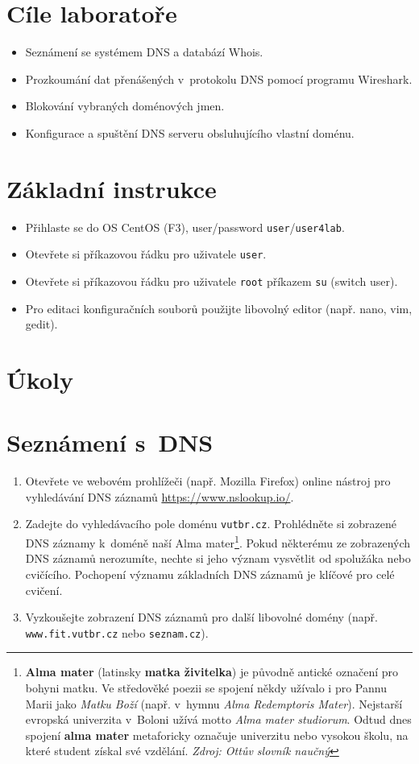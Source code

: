 
\section*{Cíle laboratoře}
\begin{itemize}
  \item Seznámení se systémem DNS a databází Whois.
  \item Prozkoumání dat přenášených v~protokolu DNS pomocí programu Wireshark.
  \item Blokování vybraných doménových jmen.
  \item Konfigurace a spuštění DNS serveru obsluhujícího vlastní doménu.
\end{itemize}

\section*{Základní instrukce}
\begin{itemize}
  \item Přihlaste se do OS CentOS (F3), user/password {\tt user}/{\tt user4lab}.
  \item Otevřete si příkazovou řádku pro uživatele {\tt user}.
  \item Otevřete si příkazovou řádku pro uživatele {\tt root} příkazem {\tt su}
    (switch user).
  \item Pro editaci konfiguračních souborů použijte libovolný editor (např.
    nano, vim, gedit).
\end{itemize}

\section*{Úkoly}

\section{Seznámení s~DNS}
\begin{enumerate}
    \item Otevřete ve webovém prohlížeči (např. Mozilla Firefox) online nástroj pro vyhledávání DNS záznamů \url{https://www.nslookup.io/}.
    \item Zadejte do vyhledávacího pole doménu \texttt{vutbr.cz}. Prohlédněte si zobrazené DNS záznamy k~doméně naší Alma mater\footnote{\textbf{Alma mater} (latinsky \textbf{matka živitelka}) je původně antické označení pro bohyni matku. Ve středověké poezii se spojení někdy užívalo i pro Pannu Marii jako \emph{Matku Boží} (např. v~hymnu \emph{Alma Redemptoris Mater}). Nejstarší evropská univerzita v~Boloni užívá motto \emph{Alma mater studiorum}. Odtud dnes spojení \textbf{alma mater} metaforicky označuje univerzitu nebo vysokou školu, na které student získal své vzdělání. \emph{Zdroj: Ottův slovník naučný}}. Pokud některému ze zobrazených DNS záznamů nerozumíte, nechte si jeho význam vysvětlit od spolužáka nebo cvičícího. Pochopení významu základních DNS záznamů je klíčové pro celé cvičení.
    \item Vyzkoušejte zobrazení DNS záznamů pro další libovolné domény (např. \texttt{www.fit.vutbr.cz} nebo \texttt{seznam.cz}).
\end{enumerate}


